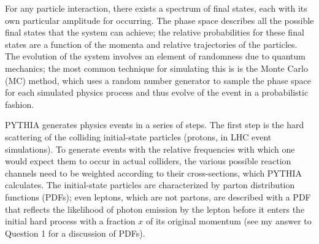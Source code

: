 For any particle interaction, there exists a spectrum of final states, each with its own particular amplitude for occurring. The phase space describes all the possible final states that the system can achieve; the relative probabilities for these final states are a function of the momenta and relative trajectories of the particles. The evolution of the system involves an element of randomness due to quantum mechanics; the most common technique for simulating this is is the Monte Carlo (MC) method, which uses a random number generator to sample the phase space for each simulated physics process and thus evolve of the event in a probabilistic fashion.

PYTHIA generates physics events in a series of steps. The first step is the hard scattering of the colliding initial-state particles (protons, in LHC event simulations). To generate events with the relative frequencies with which one would expect them to occur in actual colliders, the various possible reaction channels need to be weighted according to their cross-sections, which PYTHIA calculates. The initial-state particles are characterized by parton distribution functions (PDFs); even leptons, which are not partons, are described with a PDF that reflects the likelihood of photon emission by the lepton before it enters the initial hard process with a fraction $x$ of its original momentum (see my answer to Question 1 for a discussion of PDFs).

